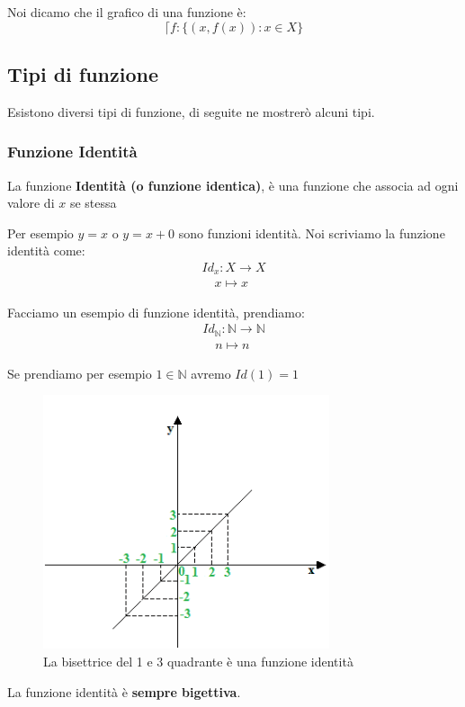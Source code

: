 \documentclass{article}
\theoremstyle{definition}
\begin{document}
Noi dicamo che il grafico di una funzione è:
\begin{equation*}
        \lceil f : \{(x, f(x)) : x \in X\} 
\end{equation*}



\subsection{Tipi di funzione} 
Esistono diversi tipi di funzione, di seguite ne mostrerò alcuni tipi.



\subsubsection{Funzione Identità}
La funzione \textbf{Identità (o funzione identica)}, è una funzione che associa ad ogni valore di $ x $ se stessa \par
Per esempio $ y=x $ o $ y = x + 0 $ sono funzioni identità. \newline
Noi scriviamo la funzione identità come:
\begin{align*}
        Id_x : X \to X \\
        \quad x \mapsto x
\end{align*}

Facciamo un esempio di funzione identità, prendiamo:
\begin{align*}
        Id_{\mathbb{N}} : \mathbb{N} \to \mathbb{N} \\
        \quad n \mapsto n
\end{align*}

Se prendiamo per esempio $ 1 \in \mathbb{N} $ avremo $ Id(1) = 1 $ \par
\begin{figure}[h]
        \centering
                \includegraphics[width=0.75\textwidth]{es_funz_identita.png}
        \caption{La bisettrice del 1 e 3 quadrante è una funzione identità}\label{fig:esempio_funzione_identità}
\end{figure}
La funzione identità è \textbf{sempre bigettiva}.
\end{document}
